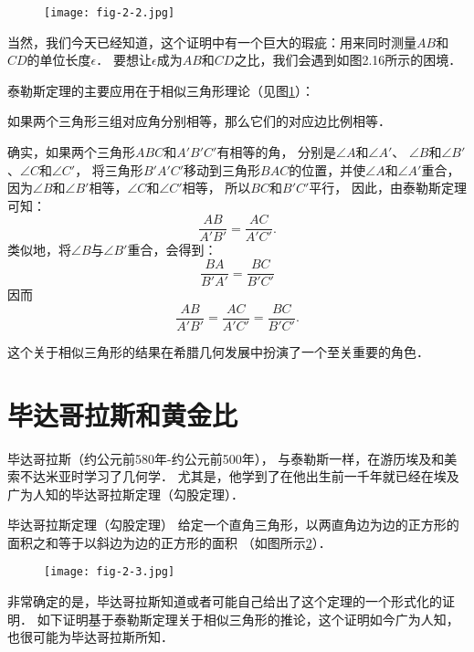 \documentclass[cn,fancy,blue,11pt]{elegantbook}
\begin{document}
\begin{figure}[htbp]
	\centering
	\texttt{[image: fig-2-2.jpg]}
	\caption{\label{fig:2-2}}
\end{figure}

当然，我们今天已经知道，这个证明中有一个巨大的瑕疵：用来同时测量$AB$和$CD$的单位长度$\epsilon$．
要想让$\epsilon$成为$AB$和$CD$之比，我们会遇到如图2.16所示的困境．

泰勒斯定理的主要应用在于相似三角形理论（见图\ref{fig:2-2}）：

\begin{corollary*}{}{}
	如果两个三角形三组对应角分别相等，那么它们的对应边比例相等．
\end{corollary*}

确实，如果两个三角形$ABC$和$A'B'C'$有相等的角，
分别是$\angle A$和$\angle A'$、
$\angle B$和$\angle B'$、$\angle C$和$\angle C'$，
将三角形$B'A'C'$移动到三角形$BAC$的位置，并使$\angle A$和$\angle A'$重合，
因为$\angle B$和$\angle B'$相等，$\angle C$和$\angle C'$相等，
所以$BC$和$B'C'$平行，
因此，由泰勒斯定理可知：
\[\frac{AB}{A'B'}=\frac{AC}{A'C'}.\]
类似地，将$\angle B$与$\angle B'$重合，会得到：
\[\frac{BA}{B'A'}=\frac{BC}{B'C'}\]
因而
\[\frac{AB}{A'B'}=\frac{AC}{A'C'}=\frac{BC}{B'C'}.\]

这个关于相似三角形的结果在希腊几何发展中扮演了一个至关重要的角色．

\section{毕达哥拉斯和黄金比}

毕达哥拉斯（约公元前580年-约公元前500年），
与泰勒斯一样，在游历埃及和美索不达米亚时学习了几何学．
尤其是，他学到了在他出生前一千年就已经在埃及广为人知的毕达哥拉斯定理（勾股定理）．

\begin{theorem*}{毕达哥拉斯定理（勾股定理）}{}
	给定一个直角三角形，以两直角边为边的正方形的面积之和等于以斜边为边的正方形的面积
	（如图所示\ref{fig:2-3}）．
\end{theorem*}

\begin{figure}[htbp]
	\centering
	\texttt{[image: fig-2-3.jpg]}
	\caption{\label{fig:2-3}}
\end{figure}

非常确定的是，毕达哥拉斯知道或者可能自己给出了这个定理的一个形式化的证明．
如下证明基于泰勒斯定理关于相似三角形的推论，这个证明如今广为人知，也很可能为毕达哥拉斯所知．
\end{document}

